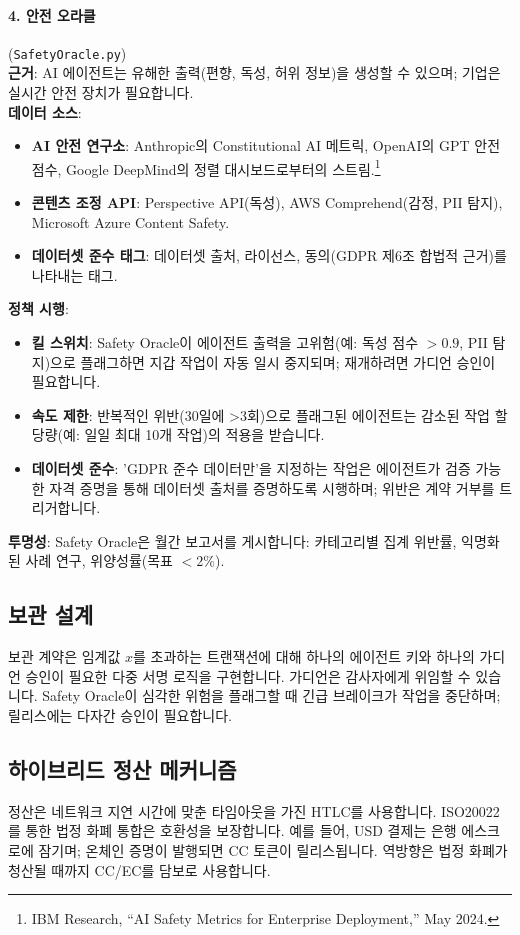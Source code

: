 \documentclass[11pt]{article}
\begin{document}
\paragraph{4. 안전 오라클} (\texttt{SafetyOracle.py})\\
\textbf{근거}: AI 에이전트는 유해한 출력(편향, 독성, 허위 정보)을 생성할 수 있으며; 기업은 실시간 안전 장치가 필요합니다.\\
\textbf{데이터 소스}:
\begin{itemize}[noitemsep]
  \item \textbf{AI 안전 연구소}: Anthropic의 Constitutional AI 메트릭, OpenAI의 GPT 안전 점수, Google DeepMind의 정렬 대시보드로부터의 스트림.\footnote{IBM Research, ``AI Safety Metrics for Enterprise Deployment,'' May 2024.}
  \item \textbf{콘텐츠 조정 API}: Perspective API(독성), AWS Comprehend(감정, PII 탐지), Microsoft Azure Content Safety.
  \item \textbf{데이터셋 준수 태그}: 데이터셋 출처, 라이선스, 동의(GDPR 제6조 합법적 근거)를 나타내는 태그.
\end{itemize}
\textbf{정책 시행}:
\begin{itemize}[noitemsep]
  \item \textbf{킬 스위치}: Safety Oracle이 에이전트 출력을 고위험(예: 독성 점수 $>0.9$, PII 탐지)으로 플래그하면 지갑 작업이 자동 일시 중지되며; 재개하려면 가디언 승인이 필요합니다.
  \item \textbf{속도 제한}: 반복적인 위반(30일에 >3회)으로 플래그된 에이전트는 감소된 작업 할당량(예: 일일 최대 10개 작업)의 적용을 받습니다.
  \item \textbf{데이터셋 준수}: 'GDPR 준수 데이터만'을 지정하는 작업은 에이전트가 검증 가능한 자격 증명을 통해 데이터셋 출처를 증명하도록 시행하며; 위반은 계약 거부를 트리거합니다.
\end{itemize}
\textbf{투명성}: Safety Oracle은 월간 보고서를 게시합니다: 카테고리별 집계 위반률, 익명화된 사례 연구, 위양성률(목표 $<2\%$).

\subsection{보관 설계}
보관 계약은 임계값 $x$를 초과하는 트랜잭션에 대해 하나의 에이전트 키와 하나의 가디언 승인이 필요한 다중 서명 로직을 구현합니다. 가디언은 감사자에게 위임할 수 있습니다. Safety Oracle이 심각한 위험을 플래그할 때 긴급 브레이크가 작업을 중단하며; 릴리스에는 다자간 승인이 필요합니다.

\subsection{하이브리드 정산 메커니즘}
정산은 네트워크 지연 시간에 맞춘 타임아웃을 가진 HTLC를 사용합니다. ISO20022를 통한 법정 화폐 통합은 호환성을 보장합니다. 예를 들어, USD 결제는 은행 에스크로에 잠기며; 온체인 증명이 발행되면 CC 토큰이 릴리스됩니다. 역방향은 법정 화폐가 청산될 때까지 CC/EC를 담보로 사용합니다.
\end{document}
